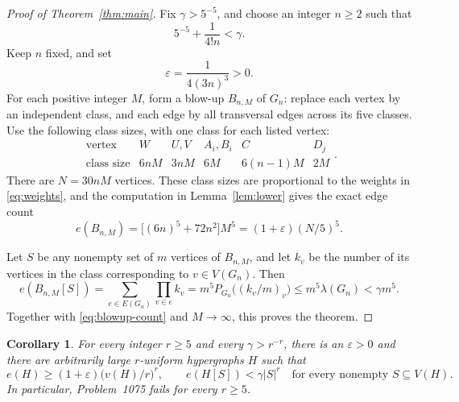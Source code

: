 \documentclass[11pt]{article}
\newtheorem{corollary}[theorem]{Corollary}
\numberwithin{equation}{section}
\begin{document}
\begin{proof}[Proof of Theorem~\ref{thm:main}]
Fix \(\gamma>5^{-5}\), and choose an integer \(n\ge2\) such that
\[
 5^{-5}+\frac1{4!n}<\gamma.
\]
Keep \(n\) fixed, and set
\[
 \varepsilon=\frac1{4(3n)^{3}}>0.
\]
For each positive integer \(M\), form a blow-up \(B_{n,M}\) of
\(G_n\): replace each vertex by an independent class, and each
edge by all transversal edges across its five classes.
Use the following class sizes, with one class for each listed vertex:
\[
 \begin{array}{c|ccccc}
 \text{vertex}&W&U,V&A_i,B_i&C&D_j\\ \hline
 \text{class size}&6nM&3nM&6M&6(n-1)M&2M
 \end{array}.
\]
There are \(N=30nM\) vertices. These class sizes are proportional
to the weights in \eqref{eq:weights}, and the computation in
Lemma~\ref{lem:lower} gives the exact edge count
\begin{equation}\label{eq:blowup-count}
 e(B_{n,M})=\bigl[(6n)^{5}+72n^2\bigr]M^{5}
 =(1+\varepsilon)(N/5)^{5}.
\end{equation}

Let \(S\) be any nonempty set of \(m\) vertices of \(B_{n,M}\),
and let \(k_v\) be the number of its vertices in the class
corresponding to \(v\in V(G_n)\). Then
\[
 e(B_{n,M}[S])
 =\sum_{e\in E(G_n)}\prod_{v\in e}k_v
 =m^{5}P_{G_n}\bigl((k_v/m)_v\bigr)
 \le m^{5}\lambda(G_n)<\gamma m^{5}.
\]
Together with \eqref{eq:blowup-count} and \(M\to\infty\), this
proves the theorem.
\end{proof}

\begin{corollary}\label{cor:all-r}
For every integer \(r\ge5\) and every \(\gamma>r^{-r}\), there is an
\(\varepsilon>0\) and there are arbitrarily large \(r\)-uniform
hypergraphs \(H\) such that
\[
 e(H)\ge(1+\varepsilon)\bigl(v(H)/r\bigr)^r,
 \qquad
 e(H[S])<\gamma|S|^r
 \quad\text{for every nonempty }S\subseteq V(H).
\]
In particular, Problem~1075 fails for every \(r\ge5\).
\end{corollary}
\end{document}
